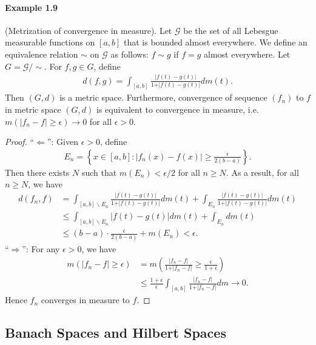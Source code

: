 \documentclass{article}
\begin{document}
\paragraph{Example 1.9\label{example:1.9}} (Metrization of convergence in measure). Let $\mathcal{G}$ be the set of all Lebesgue measurable functions on $[a,b]$ that is bounded almost everywhere. We define an equivalence relation $\sim$ on $\mathcal{G}$ as follows: $f\sim g$ if $f=g$ almost everywhere. Let $G=\mathcal{G}/\sim$. For $f,g\in G$, define
\begin{align*}
	d(f,g)=\int_{[a,b]}\frac{\vert f(t)-g(t)\vert}{1+\vert f(t)-g(t)\vert} dm(t).
\end{align*}
Then $(G,d)$ is a metric space. Furthermore, convergence of sequence $(f_n)$ to $f$ in metric space $(G,d)$ is equivalent to convergence in measure, i.e. $m(\vert f_n - f\vert \geq \epsilon)\to 0$ for all $\epsilon > 0$.
\begin{proof}
``$\Leftarrow$'': Given $\epsilon > 0$, define 
\begin{align*}
	E_n = \left\{x\in[a,b]:\vert f_n(x)-f(x)\vert\geq \frac{\epsilon}{2(b-a)}\right\}.\tag{1.5}\label{1.5}
\end{align*}
Then there exists $N$ such that $m(E_n)<\epsilon/2$ for all $n \geq N$. As a result, for all $n\geq N$, we have
\begin{align*}
	d(f_n,f) &= \int_{[a,b]\backslash E_n}\frac{\vert f(t)-g(t)\vert}{1+\vert f(t)-g(t)\vert} dm(t) + \int_{E_n}\frac{\vert f(t)-g(t)\vert}{1+\vert f(t)-g(t)\vert} dm(t)\\
	&\leq \int_{[a,b]\backslash E_n}\vert f(t)-g(t)\vert dm(t) + \int_{E_n} dm(t)\\
	&\leq (b-a)\cdot \frac{\epsilon}{2(b-a)} + m(E_n) < \epsilon.
\end{align*}
``$\Rightarrow$'': For any $\epsilon > 0$, we have
\begin{align*}
	m(\vert f_n-f\vert \geq\epsilon) &= m\left(\frac{\vert f_n-f\vert}{1+\vert f_n-f\vert} \geq\frac{\epsilon}{1+\epsilon}\right)\\
	&\leq \frac{1+\epsilon}{\epsilon}\int_{[a,b]}\frac{\vert f_n-f\vert}{1+\vert f_n-f\vert}dm\to 0.\tag{1.6}
\end{align*}
Hence $f_n$ converges in measure to $f$.
\end{proof}

\newpage
\subsection{Banach Spaces and Hilbert Spaces}
\end{document}
